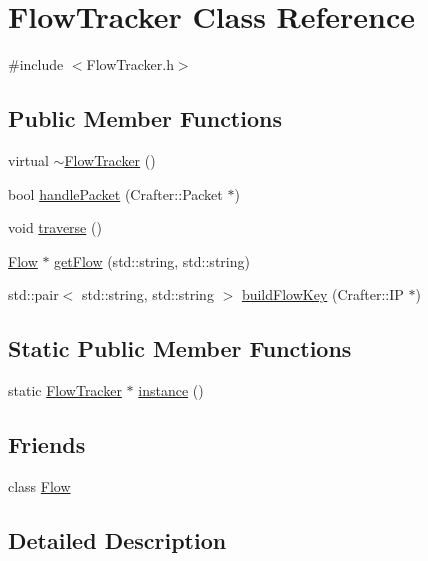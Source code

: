 \hypertarget{class_flow_tracker}{}\section{Flow\+Tracker Class Reference}
\label{class_flow_tracker}


{\ttfamily \#include $<$Flow\+Tracker.\+h$>$}

\subsection*{Public Member Functions}
\begin{DoxyCompactItemize}
\item 
virtual \hyperlink{class_flow_tracker_a439064075c7143f0bbe90183f20d7213}{$\sim$\+Flow\+Tracker} ()
\item 
bool \hyperlink{class_flow_tracker_a8209b693ab5ad12ef22f6793f4f98deb}{handle\+Packet} (Crafter\+::\+Packet $\ast$)
\item 
void \hyperlink{class_flow_tracker_a65f7a0712c4ed35bb1ed2b7ea832c61c}{traverse} ()
\item 
\hyperlink{class_flow}{Flow} $\ast$ \hyperlink{class_flow_tracker_a4ca33cbd3d000f5378743e23bbe64b20}{get\+Flow} (std\+::string, std\+::string)
\item 
std\+::pair$<$ std\+::string, std\+::string $>$ \hyperlink{class_flow_tracker_a3f379f0ef44c9b1af4e83ca67952938b}{build\+Flow\+Key} (Crafter\+::\+IP $\ast$)
\end{DoxyCompactItemize}
\subsection*{Static Public Member Functions}
\begin{DoxyCompactItemize}
\item 
static \hyperlink{class_flow_tracker}{Flow\+Tracker} $\ast$ \hyperlink{class_flow_tracker_ad0202e9012b222ffb96eb3c108949053}{instance} ()
\end{DoxyCompactItemize}
\subsection*{Friends}
\begin{DoxyCompactItemize}
\item 
class \hyperlink{class_flow_tracker_a4f3bf5ddad62048a5ba0f424952c3e35}{Flow}
\end{DoxyCompactItemize}


\subsection{Detailed Description}



